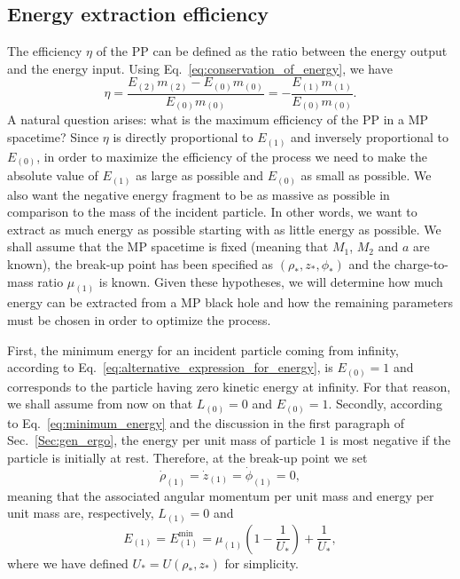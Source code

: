 \subsection{Energy extraction efficiency}

The efficiency $\eta$ of the PP can be defined as the ratio between the energy output and the energy input. Using Eq.~\eqref{eq:conservation_of_energy}, we have
\begin{equation}
  \eta = \frac{E_{(2)}m_{(2)} - E_{(0)}m_{(0)}}{E_{(0)}m_{(0)}} = - \frac{E_{(1)}m_{(1)}}{E_{(0)}m_{(0)}}.
  \label{eq:penrose_efficiency_general}
\end{equation}
%
A natural question arises: what is the maximum efficiency of the PP in a MP spacetime? Since $\eta$ is directly proportional to $E_{(1)}$ and inversely proportional to $E_{(0)}$, in order to maximize the efficiency of the process we need to make the absolute value of $E_{(1)}$ as large as possible and $E_{(0)}$ as small as possible. We also want the negative energy fragment to be as massive as possible in comparison to the mass of the incident particle. In other words, we want to extract as much energy as possible starting with as little energy as possible. We shall assume that the MP spacetime is fixed (meaning that $M_1$, $M_2$ and $a$ are known), the break-up point has been specified as $(\rho_*, z_*, \phi_*)$ and the charge-to-mass ratio $\mu_{(1)}$ is known. Given these hypotheses, we will determine how much energy can be extracted from a MP black hole and how the remaining parameters must be chosen in order to optimize the process.

First, the minimum energy for an incident particle coming from infinity, according to Eq.~\eqref{eq:alternative_expression_for_energy}, is $E_{(0)}=1$ and corresponds to the particle having zero kinetic energy at infinity. For that reason, we shall assume from now on that $L_{(0)}=0$ and $E_{(0)}=1$. Secondly, according to Eq.~\eqref{eq:minimum_energy} and the discussion in the first paragraph of Sec.~\ref{Sec:gen_ergo}, the energy per unit mass of particle $1$ is most negative if the particle is initially at rest. Therefore, at the break-up point we set
\begin{equation} \label{eq:traj1}
  \dot{\rho}_{(1)}=\dot{z}_{(1)}=\dot{\phi}_{(1)}=0,
\end{equation}
meaning that the associated angular momentum per unit mass and energy per unit mass are, respectively, $L_{(1)}=0$ and
\begin{equation} \label{eq:penrose_neg_energy}
  E_{(1)}=E_{(1)}^{\mathrm {min}}=\mu_{(1)}\left(1 - \frac{1}{U_*} \right) + \frac{1}{U_*},
\end{equation}
where we have defined $U_*=U(\rho_*,z_*)$ for simplicity.

